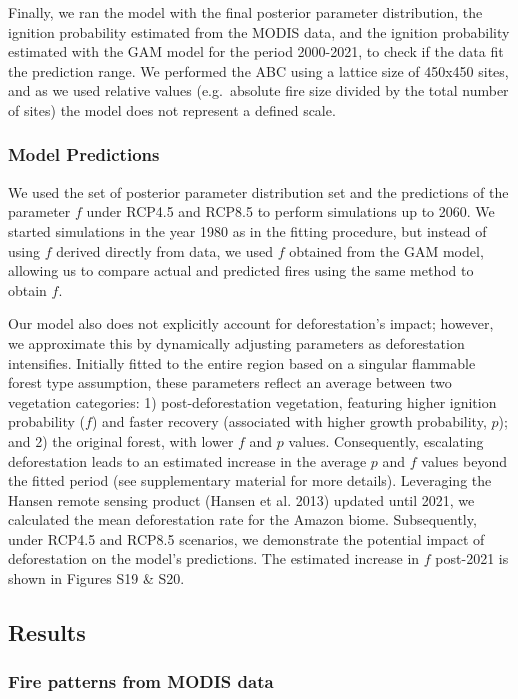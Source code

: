 \documentclass[
]{article}
\begin{document}
Finally, we ran the model with the final posterior parameter
distribution, the ignition probability estimated from the MODIS data,
and the ignition probability estimated with the GAM model for the period
2000-2021, to check if the data fit the prediction range. We performed
the ABC using a lattice size of 450x450 sites, and as we used relative
values (e.g.~absolute fire size divided by the total number of sites)
the model does not represent a defined scale.

\subsubsection{Model Predictions}\label{model-predictions}

We used the set of posterior parameter distribution set and the
predictions of the parameter \(f\) under RCP4.5 and RCP8.5 to perform
simulations up to 2060. We started simulations in the year 1980 as in
the fitting procedure, but instead of using \(f\) derived directly from
data, we used \(f\) obtained from the GAM model, allowing us to compare
actual and predicted fires using the same method to obtain \(f\).

Our model also does not explicitly account for deforestation's impact;
however, we approximate this by dynamically adjusting parameters as
deforestation intensifies. Initially fitted to the entire region based
on a singular flammable forest type assumption, these parameters reflect
an average between two vegetation categories: 1) post-deforestation
vegetation, featuring higher ignition probability (\(f\)) and faster
recovery (associated with higher growth probability, \(p\)); and 2) the
original forest, with lower \(f\) and \(p\) values. Consequently,
escalating deforestation leads to an estimated increase in the average
\(p\) and \(f\) values beyond the fitted period (see supplementary
material for more details). Leveraging the Hansen remote sensing product
(Hansen et al. 2013) updated until 2021, we calculated the mean
deforestation rate for the Amazon biome. Subsequently, under RCP4.5 and
RCP8.5 scenarios, we demonstrate the potential impact of deforestation
on the model's predictions. The estimated increase in \(f\) post-2021 is
shown in Figures S19 \& S20.

\subsection{Results}\label{results}

\subsubsection{Fire patterns from MODIS
data}\label{fire-patterns-from-modis-data}
\end{document}
